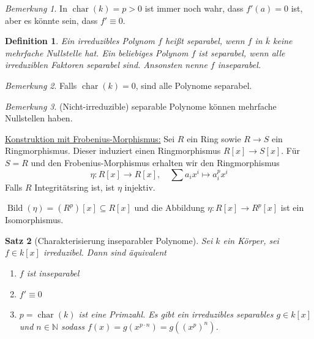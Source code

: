 \documentclass[a4paper,12pt,numbers=noenddot,parskip=full]{scrartcl}
\newcommand{\setN}{\mathbb{N}}
\newcommand{\heading}{\underline}
\theoremstyle{dotless}
\newtheorem{theorem}{Satz}[section]
\newtheorem{definition}[theorem]{Definition}
\theoremstyle{remark}
\newtheorem*{remark}{Bemerkung}
\begin{document}
	\begin{remark}
		In $\operatorname{char}(k) = p > 0$ ist immer noch wahr, dass $f'(a) = 0$ ist, aber es könnte sein, dass $f' \equiv 0$.
	\end{remark}

	\begin{definition}
		Ein irreduzibles Polynom $f$ heißt separabel, wenn $f$ in $\overline{k}$ keine mehrfache Nullstelle hat. Ein beliebiges Polynom $f$ ist separabel, wenn alle irreduziblen Faktoren separabel sind. Ansonsten nenne $f$ inseparabel.
	\end{definition}

	\begin{remark}
		Falls $\operatorname{char}(k) = 0$, sind alle Polynome separabel.
	\end{remark}

	\begin{remark}
		(Nicht-irreduzible) separable Polynome können mehrfache Nullstellen haben.
	\end{remark}

	\heading{Konstruktion mit Frobenius-Morphismus:} Sei $R$ ein Ring sowie $R \to S$ ein Ringmorphismus. Dieser induziert einen Ringmorphismus $R[x] \to S[x]$. Für $S = R$ und den Frobenius-Morphismus erhalten wir den Ringmorphismus
	\begin{equation*}
		\eta: R[x] \to R[x], \quad \sum a_i x^i \mapsto a_i^p x^i
	\end{equation*}
	Falls $R$ Integritätsring ist, ist $\eta$ injektiv.
	
	$\operatorname{Bild}(\eta) = (R^p)[x] \subseteq R[x]$ und die Abbildung $\eta: R[x] \to R^p[x]$ ist ein Isomorphismus.
	
	\begin{theorem}[Charakterisierung inseparabler Polynome]
		Sei $k$ ein Körper, sei $f \in k[x]$ irreduzibel. Dann sind äquivalent
		\begin{enumerate}
			\item $f$ ist inseparabel
			\item $f' \equiv 0$
			\item $p = \operatorname{char}(k)$ ist eine Primzahl. Es gibt ein irreduzibles separables $g \in k[x]$ und $n \in \setN$ sodass $f(x) = g(x^{p \cdot n}) = g((x^p)^n)$.
		\end{enumerate}
	\end{theorem}
\end{document}
